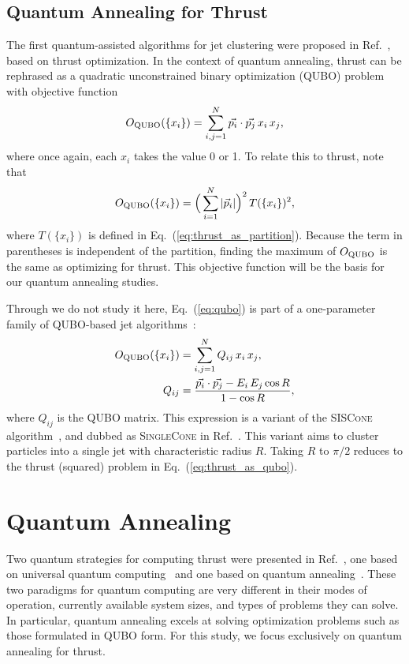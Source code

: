 \documentclass[aps,prd,twocolumn,superscriptaddress,preprintnumbers,nofootinbib,longbibliography,floatfix]{revtex4-1}
\DeclareRobustCommand{\Eq}[1]{Eq.~(\ref{eq:#1})}
\DeclareRobustCommand{\Ref}[1]{Ref.~\cite{#1}}
\begin{document}
\subsection{Quantum Annealing for Thrust}

The first quantum-assisted algorithms for jet clustering were proposed in \Ref{PhysRevD.101.094015}, based on thrust optimization.
%
In the context of quantum annealing, thrust can be rephrased as a quadratic unconstrained binary optimization (QUBO) problem with objective function
%
\begin{equation}
    \label{eq:qubo}
    O_{\rm QUBO}(\{x_i\}) = \sum_{i,j=1}^{N} \vec{p_{i}}\cdot\vec{p_{j}} \, x_{i} \, x_{j},
\end{equation}
%
where once again, each $x_i$ takes the value 0 or 1.
%
To relate this to thrust, note that
%
\begin{equation}
\label{eq:thrust_as_qubo}
    O_{\rm QUBO}(\{x_i\}) = \Big( \sum_{i = 1}^N |\vec{p}_{i}| \Big)^2 \, T(\{x_i\})^2,
\end{equation}
%
where $T(\{x_i\})$ is defined in \Eq{thrust_as_partition}.
%
Because the term in parentheses is independent of the partition, finding the maximum of $O_{\rm QUBO}$ is the same as optimizing for thrust.
%
This objective function will be the basis for our quantum annealing studies.


Through we do not study it here, \Eq{qubo} is part of a one-parameter family of QUBO-based jet algorithms~\cite{PhysRevD.101.094015}:
\begin{align}
\label{eq:qubo_singlecone}
    O_{\rm QUBO}(\{x_i\}) &= \sum_{i,j=1}^{N} Q_{ij} \, x_{i} \, x_{j},\\
    Q_{ij} &= \frac{\vec{p_{i}}\cdot\vec{p_{j}} - E_{i}\, E_{j}\cos R}{1 - \cos R},
\end{align}
%
where $Q_{ij}$ is the QUBO matrix.
%
This expression is a variant of the \textsc{SISCone} algorithm~\cite{Salam_2007}, and dubbed as \textsc{SingleCone} in \Ref{PhysRevD.101.094015}.
%
This variant aims to cluster particles into a single jet with characteristic radius $R$.
%
Taking $R$ to $\pi/2$ reduces to the thrust (squared) problem in \Eq{thrust_as_qubo}.



\section{Quantum Annealing}
\label{sec:quantumannealing}


Two quantum strategies for computing thrust were presented in \Ref{PhysRevD.101.094015}, one based on universal quantum computing~\cite{Benioff1980,Feynman1982, 1985QT} and one based on quantum annealing~\cite{Johnson2011,Harris_2010,ApolloniCesa, APOLLONI1989233, PhysRevE.58.5355,FINNILA1994343}.
%
These two paradigms for quantum computing are very different in their modes of operation, currently available system sizes, and types of problems they can solve.
%
In particular, quantum annealing excels at solving optimization problems such as those formulated in QUBO form.
%
For this study, we focus exclusively on quantum annealing for thrust. 
\end{document}
